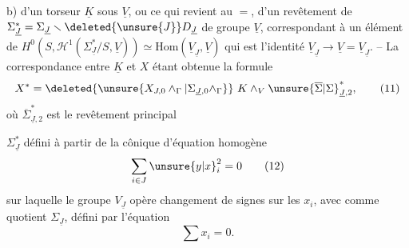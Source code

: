 b) d'un torseur $\underline K$ sous $\underline V$, ou ce qui revient au $=$, d'un revêtement    de $\Sigma_{\underline J}^*=\Sigma_{\underline J}\smallsetminus\deleted{\unsure{J}}D_{\underline J}$ de groupe $\underline V$,  correspondant à \deleted{$\unsure{\xi}$} un élément de  $H^0(S,\mathcal H^1(\Sigma_{\underline J}^*/S,\underline V))\simeq\mathrm{Hom}(\underline V_{\underline J},\underline V)$  qui est l'identité $\underline V_{\underline J}\longrightarrow \underline V=\underline V_{\underline J}$.
-- La correspondance entre $\underline K$ et $X$ étant obtenue  la formule
\[
 X^*=\deleted{\unsure{X_{J,0}\wedge_{\Gamma}|\Sigma_{\underline J,0}\wedge_{\Gamma}}}\ K\mathbin{\wedge}_{V}\unsure{\overline\Sigma|\Sigma}_{\underline J,2}^*, \tag*{(11)}
\]
où $\overline\Sigma_{\underline J,2}^*$ est le revêtement principal 

$\Sigma^*_{\underline J}$ défini  à partir de  la cônique  d'équation homogène
\[
 \sum_{i\in J}\unsure{y|x}_i^2=0 \tag*{(12)}
\]
sur laquelle le groupe $V_{\underline J}$  opère   changement de signes sur les $x_i$, avec comme quotient $\Sigma_{\underline J}$, défini par l'équation 
\[
 \sum x_i=0 . \tag*{(13)}
\]

